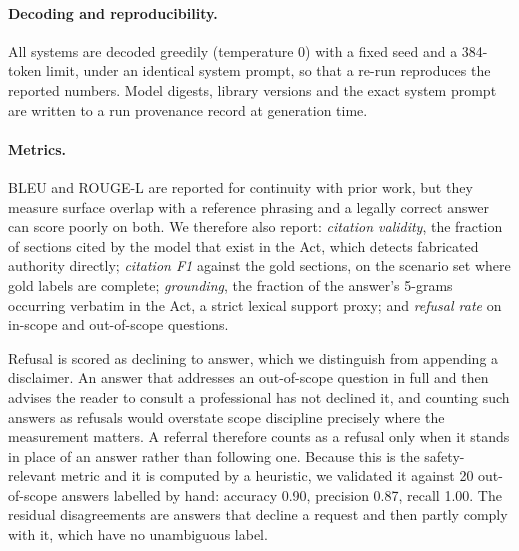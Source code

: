 \documentclass[11pt,a4paper]{article}
\begin{document}
\paragraph{Decoding and reproducibility.} All systems are decoded greedily (temperature 0) with a fixed seed and a 384-token limit, under an identical system prompt, so that a re-run reproduces the reported numbers. Model digests, library versions and the exact system prompt are written to a run provenance record at generation time.

\paragraph{Metrics.} BLEU\cite{ref_bleu} and ROUGE-L\cite{ref_rouge} are reported for continuity with prior work, but they measure surface overlap with a reference phrasing and a legally correct answer can score poorly on both. We therefore also report: \emph{citation validity}, the fraction of sections cited by the model that exist in the Act, which detects fabricated authority directly; \emph{citation F1} against the gold sections, on the scenario set where gold labels are complete; \emph{grounding}, the fraction of the answer's 5-grams occurring verbatim in the Act, a strict lexical support proxy; and \emph{refusal rate} on in-scope and out-of-scope questions.

Refusal is scored as declining to answer, which we distinguish from appending a disclaimer. An answer that addresses an out-of-scope question in full and then advises the reader to consult a professional has not declined it, and counting such answers as refusals would overstate scope discipline precisely where the measurement matters. A referral therefore counts as a refusal only when it stands in place of an answer rather than following one. Because this is the safety-relevant metric and it is computed by a heuristic, we validated it against 20 out-of-scope answers labelled by hand: accuracy 0.90, precision 0.87, recall 1.00. The residual disagreements are answers that decline a request and then partly comply with it, which have no unambiguous label.
\end{document}
